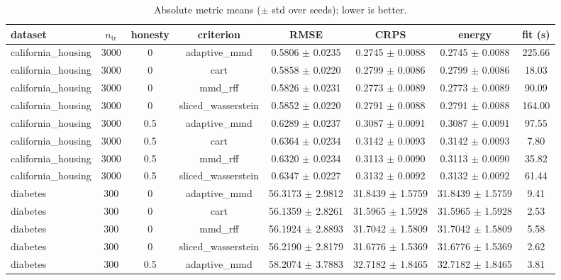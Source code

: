 \begin{table}[h]
  \centering
  \caption{Absolute metric means ($\pm$ std over seeds); lower is better.}
  \label{tab:real_absolute}
  \begin{adjustbox}{max width=\textwidth}
  \begin{tabular}{lccccccc}
    \toprule
    dataset & $n_{\mathrm{tr}}$ & honesty & criterion & RMSE & CRPS & energy & fit (s) \\
    \midrule
    california\_housing & 3000 & 0 & adaptive\_mmd & 0.5806 $\pm$ 0.0235 & 0.2745 $\pm$ 0.0088 & 0.2745 $\pm$ 0.0088 & 225.66 \\
    california\_housing & 3000 & 0 & cart & 0.5858 $\pm$ 0.0220 & 0.2799 $\pm$ 0.0086 & 0.2799 $\pm$ 0.0086 & 18.03 \\
    california\_housing & 3000 & 0 & mmd\_rff & 0.5826 $\pm$ 0.0231 & 0.2773 $\pm$ 0.0089 & 0.2773 $\pm$ 0.0089 & 90.09 \\
    california\_housing & 3000 & 0 & sliced\_wasserstein & 0.5852 $\pm$ 0.0220 & 0.2791 $\pm$ 0.0088 & 0.2791 $\pm$ 0.0088 & 164.00 \\
    california\_housing & 3000 & 0.5 & adaptive\_mmd & 0.6289 $\pm$ 0.0237 & 0.3087 $\pm$ 0.0091 & 0.3087 $\pm$ 0.0091 & 97.55 \\
    california\_housing & 3000 & 0.5 & cart & 0.6364 $\pm$ 0.0234 & 0.3142 $\pm$ 0.0093 & 0.3142 $\pm$ 0.0093 & 7.80 \\
    california\_housing & 3000 & 0.5 & mmd\_rff & 0.6320 $\pm$ 0.0234 & 0.3113 $\pm$ 0.0090 & 0.3113 $\pm$ 0.0090 & 35.82 \\
    california\_housing & 3000 & 0.5 & sliced\_wasserstein & 0.6347 $\pm$ 0.0227 & 0.3132 $\pm$ 0.0092 & 0.3132 $\pm$ 0.0092 & 61.44 \\
    diabetes & 300 & 0 & adaptive\_mmd & 56.3173 $\pm$ 2.9812 & 31.8439 $\pm$ 1.5759 & 31.8439 $\pm$ 1.5759 & 9.41 \\
    diabetes & 300 & 0 & cart & 56.1359 $\pm$ 2.8261 & 31.5965 $\pm$ 1.5928 & 31.5965 $\pm$ 1.5928 & 2.53 \\
    diabetes & 300 & 0 & mmd\_rff & 56.1924 $\pm$ 2.8893 & 31.7042 $\pm$ 1.5809 & 31.7042 $\pm$ 1.5809 & 5.58 \\
    diabetes & 300 & 0 & sliced\_wasserstein & 56.2190 $\pm$ 2.8179 & 31.6776 $\pm$ 1.5369 & 31.6776 $\pm$ 1.5369 & 2.62 \\
    diabetes & 300 & 0.5 & adaptive\_mmd & 58.2074 $\pm$ 3.7883 & 32.7182 $\pm$ 1.8465 & 32.7182 $\pm$ 1.8465 & 3.81 \\

\end{tabular}
\end{adjustbox}
\end{table}
